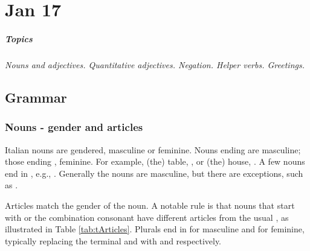 \chapter{Jan 17}
\paragraph{Topics}
\textit{Nouns and adjectives. Quantitative adjectives. Negation. Helper verbs. Greetings.}

\section{Grammar} \label{0117-Grammar}
\subsection{Nouns - gender and articles}

Italian nouns are gendered, masculine or feminine. Nouns ending  are masculine; 
those ending , feminine. For example, (the) table, , or (the) house, 
. A few nouns end in , e.g., . 
Generally the  nouns are masculine, but there are exceptions, such as .

Articles match the gender of the noun. A notable rule is that nouns that start with  
or the combination  consonant have different articles from the usual , 
as illustrated in Table \ref{tab:tArticles}. Plurals end in  for masculine and 
for feminine, typically replacing the terminal  and  with  and 
respectively. 

